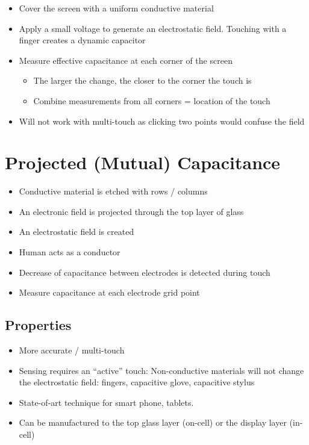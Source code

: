 \documentclass{article}
\begin{document}
\begin{itemize}
  \item Cover the screen with a uniform conductive material
  \item Apply a small voltage to generate an electrostatic field. Touching with a finger creates a dynamic capacitor
  \item Measure effective capacitance at each corner of the screen
  \begin{itemize}
    \item The larger the change, the closer to the corner the touch is
    \item Combine measurements from all corners = location of the touch
  \end{itemize}
  \item Will not work with multi-touch as clicking two points would confuse the field
\end{itemize}

\section{Projected (Mutual) Capacitance}

\begin{itemize}
  \item Conductive material is etched with rows / columns
  \item An electronic field is projected through the top layer of glass
  \item An electrostatic field is created
  \item Human acts as a conductor
  \item Decrease of capacitance between electrodes is detected during touch 
  \item Measure capacitance at each electrode grid point
\end{itemize}

\subsection{Properties}
\begin{itemize}
  \item More accurate / multi-touch
  \item Sensing requires an “active” touch: Non-conductive materials will not change the electrostatic field: fingers, capacitive glove, capacitive stylus
  \item State-of-art technique for smart phone, tablets.
  \item Can be manufactured to the top glass layer (on-cell) or the display layer (in-cell)
\end{itemize}
\end{document}
